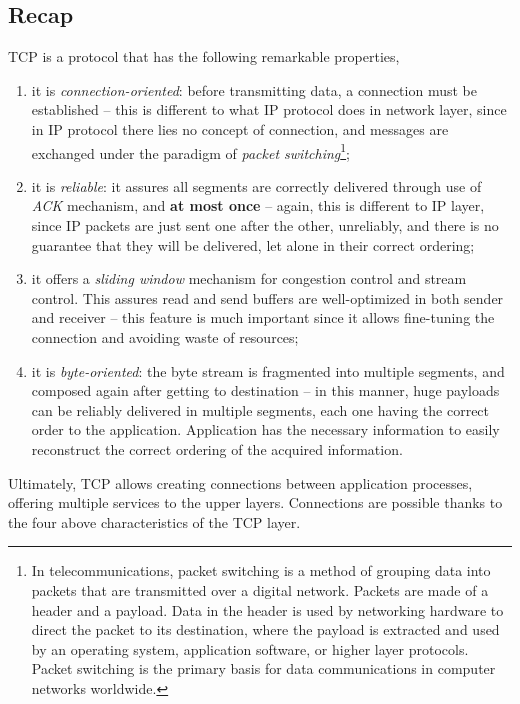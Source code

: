 \documentclass[10pt]{extbook}
\begin{document}
\subsection{Recap}

TCP is a protocol that has the following remarkable properties,

\begin{enumerate}
	\item it is \emph{connection-oriented}: before transmitting data, a
		connection must be established \--- this is different to what
		IP protocol does in network layer, since in IP protocol there
        lies no concept of connection, and messages are exchanged under the
        paradigm of \emph{packet switching}\footnote{In telecommunications,
        packet switching is a method of grouping data into packets that are
    transmitted over a digital network. Packets are made of a header and a
payload. Data in the header is used by networking hardware to direct the packet
to its destination, where the payload is extracted and used by an operating
system, application software, or higher layer protocols. Packet switching is
the primary basis for data communications in computer networks worldwide. };
	\item it is \emph{reliable}: it assures all segments are correctly
		delivered through use of \emph{ACK} mechanism, and \textbf{at
		most once} \--- again, this is different to IP layer, since IP
        packets are just sent one after the other, unreliably, and there is no
        guarantee that they will be delivered, let alone in their correct
        ordering;
	\item it offers a \emph{sliding window} mechanism for congestion control
		and stream control. This assures read and send buffers are
		well-optimized in both sender and receiver \--- this feature is
		much important since it allows fine-tuning the connection and
		avoiding waste of resources;
	\item it is \emph{byte-oriented}: the byte stream is fragmented into
		multiple segments, and composed again after getting to
		destination \--- in this manner, huge payloads can be reliably
		delivered in multiple segments, each one having the correct
		order to the application. Application has the necessary information
		to easily reconstruct the correct ordering of the acquired 
		information.
\end{enumerate}

Ultimately, TCP allows creating connections between application processes,
offering multiple services to the upper layers. Connections are possible thanks
to the four above characteristics of the TCP layer.
\end{document}
